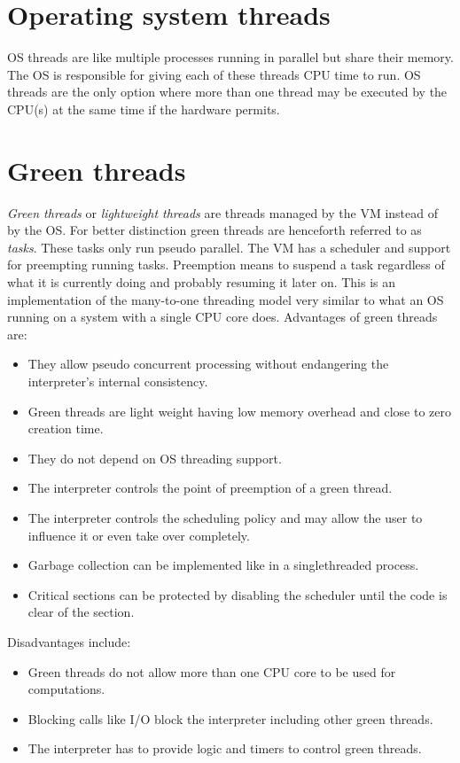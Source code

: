 \documentclass[bachelor,english]{hgbthesis}
\begin{document}
\section{Operating system threads}

OS threads are like multiple processes running in parallel but share their memory. The OS is responsible for giving each of these threads CPU time to run. OS threads are the only option where more than one thread may be executed by the CPU(s) at the same time if the hardware permits.

\section {Green threads}

\textit{Green threads} or \textit{lightweight threads} are threads managed by the VM instead of by the OS. For better distinction green threads are henceforth referred to as \textit{tasks}. These tasks only run pseudo parallel. The VM has a scheduler and support for preempting running tasks.
Preemption means to suspend a task regardless of what it is currently doing and probably resuming it later on.
This is an implementation of the many-to-one threading model very similar to what an OS running on a system with a single CPU core does.
%
Advantages of green threads are:
%
\begin{itemize}
\item They allow pseudo concurrent processing without endangering the interpreter's internal consistency.
\item Green threads are light weight having low memory overhead and close to zero creation time.
\item They do not depend on OS threading support.
\item The interpreter controls the point of preemption of a green thread.
\item The interpreter controls the scheduling policy and may allow the user to influence it or even take over completely.
\item Garbage collection can be implemented like in a singlethreaded process.
\item Critical sections can be protected by disabling the scheduler until the code is clear of the section.
\end{itemize}
%
Disadvantages include:
%
\begin{itemize}
\item Green threads do not allow more than one CPU core to be used for computations.
\item Blocking calls like I/O block the interpreter including other green threads.
\item The interpreter has to provide logic and timers to control green threads.
\end{itemize}
\end{document}

